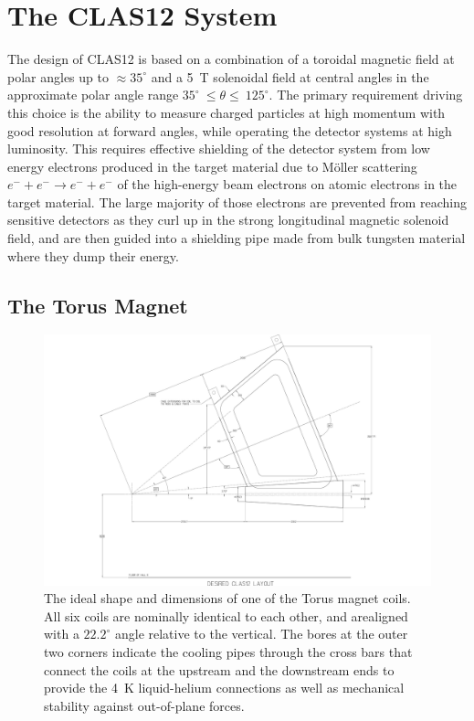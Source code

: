 \documentclass[final,3p,twocolumn]{elsarticle}
\begin{document}
\section{The CLAS12 System}

The design of CLAS12 is based on a combination of a toroidal magnetic field at polar angles up to $\approx 35^\circ$ and
a 5~T solenoidal field at central angles in the approximate polar angle range $35^\circ~\le \theta \le~125^\circ$. The
primary requirement driving this choice is the ability to measure charged particles at high momentum with good resolution
at forward angles, while operating the detector systems at high luminosity. This requires effective shielding of the detector
system from low energy electrons produced in the target material due to M\"oller scattering $e^- + e^- \to e^- + e^-$ of
the high-energy beam electrons on atomic electrons in the target material. The large majority of those electrons are
prevented from reaching sensitive detectors as they curl up in the strong longitudinal magnetic solenoid field, and are
then guided into a shielding pipe made from bulk tungsten material where they dump their energy. 

\subsection{The Torus Magnet}
\label{torus}

\begin{figure}[htbp!]
\centerline{\includegraphics[width=1.40\columnwidth]{clas12_desired.pdf}}
\caption{The ideal shape and dimensions of one of the Torus magnet coils. All six coils are nominally identical to each
other, and arealigned with a $22.2^\circ$ angle relative to the vertical. The bores at the outer two corners indicate the
cooling pipes through the cross bars that connect the coils at the upstream and the downstream ends to provide the 4~K
liquid-helium connections as well as mechanical stability against out-of-plane forces.}
\label{coil-shape}
\end{figure}
\end{document}
